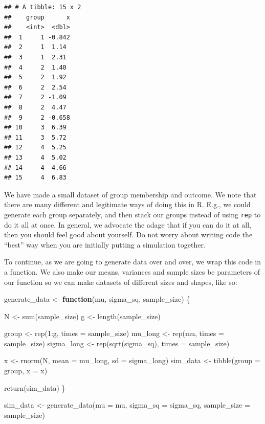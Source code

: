 \documentclass[
]{book}
\newenvironment{Shaded}{\begin{snugshade}}{\end{snugshade}}
\newcommand{\AttributeTok}[1]{\textcolor[rgb]{0.77,0.63,0.00}{#1}}
\newcommand{\ControlFlowTok}[1]{\textcolor[rgb]{0.13,0.29,0.53}{\textbf{#1}}}
\newcommand{\DecValTok}[1]{\textcolor[rgb]{0.00,0.00,0.81}{#1}}
\newcommand{\FunctionTok}[1]{\textcolor[rgb]{0.00,0.00,0.00}{#1}}
\newcommand{\NormalTok}[1]{#1}
\newcommand{\OtherTok}[1]{\textcolor[rgb]{0.56,0.35,0.01}{#1}}
\newcommand{\SpecialCharTok}[1]{\textcolor[rgb]{0.00,0.00,0.00}{#1}}
\begin{document}
\begin{verbatim}
## # A tibble: 15 x 2
##    group      x
##    <int>  <dbl>
##  1     1 -0.842
##  2     1  1.14 
##  3     1  2.31 
##  4     2  1.40 
##  5     2  1.92 
##  6     2  2.54 
##  7     2 -1.09 
##  8     2  4.47 
##  9     2 -0.658
## 10     3  6.39 
## 11     3  5.72 
## 12     4  5.25 
## 13     4  5.02 
## 14     4  4.66 
## 15     4  6.83
\end{verbatim}

We have made a small dataset of group membership and outcome.
We note that there are many different and legitimate ways of doing this in R.
E.g., we could generate each group separately, and then stack our groups instead of using \texttt{rep} to do it all at once.
In general, we advocate the adage that if you can do it at all, then you should feel good about yourself.
Do not worry about writing code the ``best'' way when you are initially putting a simulation together.

To continue, as we are going to generate data over and over, we wrap this code in a function.
We also make our means, variances and sample sizes be parameters of our function so we can make datasets of different sizes and shapes, like so:

\begin{Shaded}
\begin{Highlighting}[]
\NormalTok{generate\_data }\OtherTok{\textless{}{-}} \ControlFlowTok{function}\NormalTok{(mu, sigma\_sq, sample\_size) \{}

\NormalTok{  N }\OtherTok{\textless{}{-}} \FunctionTok{sum}\NormalTok{(sample\_size)}
\NormalTok{  g }\OtherTok{\textless{}{-}} \FunctionTok{length}\NormalTok{(sample\_size)}

\NormalTok{  group }\OtherTok{\textless{}{-}} \FunctionTok{rep}\NormalTok{(}\DecValTok{1}\SpecialCharTok{:}\NormalTok{g, }\AttributeTok{times =}\NormalTok{ sample\_size)}
\NormalTok{  mu\_long }\OtherTok{\textless{}{-}} \FunctionTok{rep}\NormalTok{(mu, }\AttributeTok{times =}\NormalTok{ sample\_size)}
\NormalTok{  sigma\_long }\OtherTok{\textless{}{-}} \FunctionTok{rep}\NormalTok{(}\FunctionTok{sqrt}\NormalTok{(sigma\_sq), }\AttributeTok{times =}\NormalTok{ sample\_size)}

\NormalTok{  x }\OtherTok{\textless{}{-}} \FunctionTok{rnorm}\NormalTok{(N, }\AttributeTok{mean =}\NormalTok{ mu\_long, }\AttributeTok{sd =}\NormalTok{ sigma\_long)}
\NormalTok{  sim\_data }\OtherTok{\textless{}{-}} \FunctionTok{tibble}\NormalTok{(}\AttributeTok{group =}\NormalTok{ group, }\AttributeTok{x =}\NormalTok{ x)}

  \FunctionTok{return}\NormalTok{(sim\_data)}
\NormalTok{\}}

\NormalTok{sim\_data }\OtherTok{\textless{}{-}} \FunctionTok{generate\_data}\NormalTok{(}\AttributeTok{mu =}\NormalTok{ mu, }\AttributeTok{sigma\_sq =}\NormalTok{ sigma\_sq, }
                          \AttributeTok{sample\_size =}\NormalTok{ sample\_size)}
\end{Highlighting}
\end{Shaded}
\end{document}
